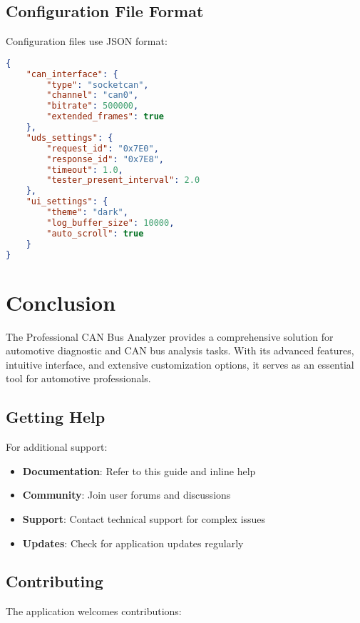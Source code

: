 \documentclass[11pt,a4paper]{article}
\begin{document}
\subsection{Configuration File Format}

Configuration files use JSON format:

\begin{lstlisting}[language=json]
{
    "can_interface": {
        "type": "socketcan",
        "channel": "can0",
        "bitrate": 500000,
        "extended_frames": true
    },
    "uds_settings": {
        "request_id": "0x7E0",
        "response_id": "0x7E8",
        "timeout": 1.0,
        "tester_present_interval": 2.0
    },
    "ui_settings": {
        "theme": "dark",
        "log_buffer_size": 10000,
        "auto_scroll": true
    }
}
\end{lstlisting}

\section{Conclusion}

The Professional CAN Bus Analyzer provides a comprehensive solution for automotive diagnostic and CAN bus analysis tasks. With its advanced features, intuitive interface, and extensive customization options, it serves as an essential tool for automotive professionals.

\subsection{Getting Help}

For additional support:

\begin{itemize}
    \item \textbf{Documentation}: Refer to this guide and inline help
    \item \textbf{Community}: Join user forums and discussions
    \item \textbf{Support}: Contact technical support for complex issues
    \item \textbf{Updates}: Check for application updates regularly
\end{itemize}

\subsection{Contributing}

The application welcomes contributions:
\end{document}
